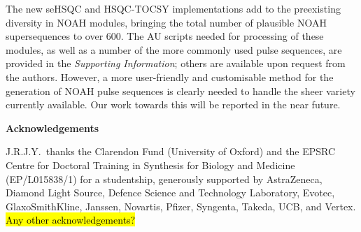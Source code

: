 \documentclass[11pt]{article}
\newcommand*{\SInf}{\textit{Supporting Information}}
\begin{document}

The new seHSQC and HSQC-TOCSY implementations add to the preexisting diversity in NOAH modules, bringing the total number of plausible NOAH supersequences to over 600.
The AU scripts needed for processing of these modules, as well as a number of the more commonly used pulse sequences, are provided in the \SInf{}; others are available upon request from the authors.
However, a more user-friendly and customisable method for the generation of NOAH pulse sequences is clearly needed to handle the sheer variety currently available.
Our work towards this will be reported in the near future.



\textbf{\Large Acknowledgements}

J.R.J.Y.\ thanks the Clarendon Fund (University of Oxford) and the EPSRC Centre for Doctoral Training in Synthesis for Biology and Medicine (EP/L015838/1) for a studentship, generously supported by AstraZeneca, Diamond Light Source, Defence Science and Technology Laboratory, Evotec, GlaxoSmithKline, Janssen, Novartis, Pfizer, Syngenta, Takeda, UCB, and Vertex.
\hl{Any other acknowledgements?}

\printbibliography

\end{document}
